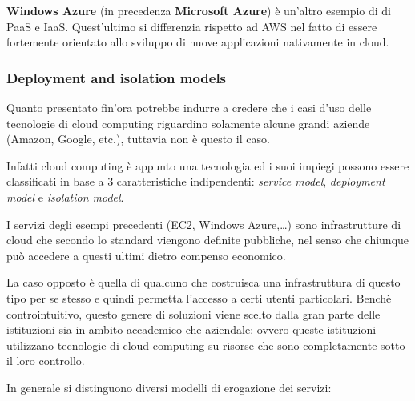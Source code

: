 \documentclass[italian,]{article}
\begin{document}
\textbf{Windows Azure} (in precedenza \textbf{Microsoft Azure}) è
un'altro esempio di di PaaS e IaaS. Quest'ultimo si differenzia rispetto
ad AWS nel fatto di essere fortemente orientato allo sviluppo di nuove
applicazioni nativamente in cloud.

\subsubsection{Deployment and isolation
models}\label{deployment-and-isolation-models}

Quanto presentato fin'ora potrebbe indurre a credere che i casi d'uso
delle tecnologie di cloud computing riguardino solamente alcune grandi
aziende (Amazon, Google, etc.), tuttavia non è questo il caso.

Infatti cloud computing è appunto una tecnologia ed i suoi impiegi
possono essere classificati in base a 3 caratteristiche indipendenti:
\emph{service model}, \emph{deployment model} e \emph{isolation model}.

I servizi degli esempi precedenti (EC2, Windows Azure,\ldots{}) sono
infrastrutture di cloud che secondo lo standard viengono definite
pubbliche, nel senso che chiunque può accedere a questi ultimi dietro
compenso economico.

La caso opposto è quella di qualcuno che costruisca una infrastruttura
di questo tipo per se stesso e quindi permetta l'accesso a certi utenti
particolari. Benchè controintuitivo, questo genere di soluzioni viene
scelto dalla gran parte delle istituzioni sia in ambito accademico che
aziendale: ovvero queste istituzioni utilizzano tecnologie di cloud
computing su risorse che sono completamente sotto il loro controllo.

In generale si distinguono diversi modelli di erogazione dei servizi:
\end{document}
